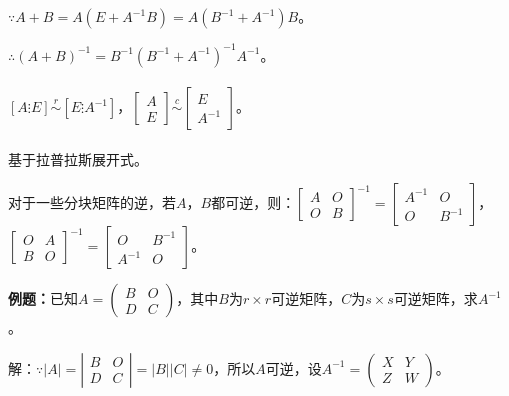 $\because A+B=A(E+A^{-1}B)=A(B^{-1}+A^{-1})B$。

$\therefore (A+B)^{-1}=B^{-1}(B^{-1}+A^{-1})^{-1}A^{-1}$。

\paragraph{}

$\left[A\vdots E\right]\overset{r}{\sim}\left[E\vdots A^{-1}\right]$，$\left[\begin{array}{c}
    A \\
    E
\end{array}\right]\overset{c}{\sim}\left[\begin{array}{c}
    E \\
    A^{-1}
\end{array}\right]$。

\paragraph{}

基于拉普拉斯展开式。

对于一些分块矩阵的逆，若$A$，$B$都可逆，则：$\left[\begin{array}{cc}
    A & O \\
    O & B
\end{array}\right]^{-1}=\left[\begin{array}{cc}
    A^{-1} & O \\
    O & B^{-1}
\end{array}\right]$，$\left[\begin{array}{cc}
    O & A \\
    B & O
\end{array}\right]^{-1}=\left[\begin{array}{cc}
    O & B^{-1} \\
    A^{-1} & O
\end{array}\right]$。\medskip

\textbf{例题：}已知$A=\left(\begin{array}{cc}
    B & O \\
    D & C
\end{array}\right)$，其中$B$为$r\times r$可逆矩阵，$C$为$s\times s$可逆矩阵，求$A^{-1}$。

解：$\because\vert A\vert=\left|\begin{array}{cc}
    B & O \\
    D & C
\end{array}\right|=\vert B\vert\vert C\vert\neq0$，所以$A$可逆，设$A^{-1}=\left(\begin{array}{cc}
    X & Y \\
    Z & W
\end{array}\right)$。

